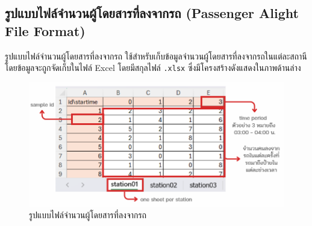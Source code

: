 \subsection{รูปแบบไฟล์จำนวนผู้โดยสารที่ลงจากรถ (Passenger Alight File Format)}
\begin{mypara}
    \indent รูปแบบไฟล์จำนวนผู้โดยสารที่ลงจากรถ ใช้สำหรับเก็บข้อมูลจำนวนผู้โดยสารที่ลงจากรถในแต่ละสถานี
    โดยข้อมูลจะถูกจัดเก็บในไฟล์ Excel โดยมีสกุลไฟล์ \texttt{.xlsx} 
    ซึ่งมีโครงสร้างดังแสดงในภาพด้านล่าง
    \begin{figure}[H]
      \centering
      \includegraphics[scale=0.5]{Passenger_alighting.png}
      \caption{รูปแบบไฟล์จำนวนผู้โดยสารที่ลงจากรถ}
      \label{fig:PassengerAlightFileFormat}
    \end{figure}
\end{mypara}
